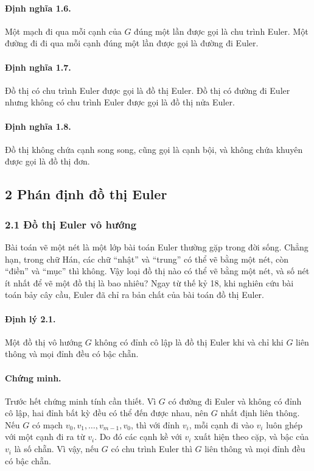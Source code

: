 \documentclass[11pt]{article}
\begin{document}
\paragraph{Định nghĩa 1.6.}
Một mạch đi qua mỗi cạnh của \(G\) đúng một lần được gọi là chu trình Euler.
Một đường đi đi qua mỗi cạnh đúng một lần được gọi là đường đi Euler.

\paragraph{Định nghĩa 1.7.}
Đồ thị có chu trình Euler được gọi là đồ thị Euler. Đồ thị có đường đi Euler
nhưng không có chu trình Euler được gọi là đồ thị nửa Euler.

\paragraph{Định nghĩa 1.8.}
Đồ thị không chứa cạnh song song, cũng gọi là cạnh bội, và không chứa khuyên
được gọi là đồ thị đơn.

\subsection*{2 Phán định đồ thị Euler}

\subsubsection*{2.1 Đồ thị Euler vô hướng}

Bài toán vẽ một nét là một lớp bài toán Euler thường gặp trong đời sống. Chẳng
hạn, trong chữ Hán, các chữ ``nhật'' và ``trung'' có thể vẽ bằng một nét, còn
``điền'' và ``mục'' thì không. Vậy loại đồ thị nào có thể vẽ bằng một nét, và
số nét ít nhất để vẽ một đồ thị là bao nhiêu? Ngay từ thế kỷ 18, khi nghiên cứu
bài toán bảy cây cầu, Euler đã chỉ ra bản chất của bài toán đồ thị Euler.

\paragraph{Định lý 2.1.}
Một đồ thị vô hướng \(G\) không có đỉnh cô lập là đồ thị Euler khi và chỉ khi
\(G\) liên thông và mọi đỉnh đều có bậc chẵn.

\paragraph{Chứng minh.}
Trước hết chứng minh tính cần thiết. Vì \(G\) có đường đi Euler và không có
đỉnh cô lập, hai đỉnh bất kỳ đều có thể đến được nhau, nên \(G\) nhất định
liên thông. Nếu \(G\) có mạch \(v_0,v_1,\ldots,v_{m-1},v_0\), thì với đỉnh
\(v_i\), mỗi cạnh đi vào \(v_i\) luôn ghép với một cạnh đi ra từ \(v_i\). Do đó
các cạnh kề với \(v_i\) xuất hiện theo cặp, và bậc của \(v_i\) là số chẵn. Vì
vậy, nếu \(G\) có chu trình Euler thì \(G\) liên thông và mọi đỉnh đều có bậc
chẵn.
\end{document}
